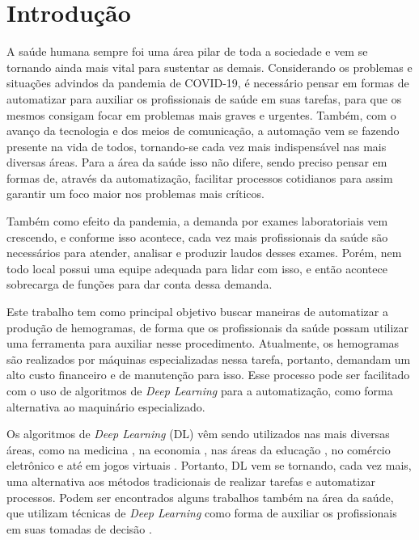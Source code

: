 \chapter{Introdução}
\label{chap:introducao}
A saúde humana sempre foi uma área pilar de toda a sociedade e vem se tornando ainda mais vital para sustentar as demais. Considerando os problemas e situações advindos da pandemia de COVID-19, é necessário pensar em formas de automatizar para auxiliar os profissionais de saúde em suas tarefas, para que os mesmos consigam focar em problemas mais graves e urgentes. Também, com o avanço da tecnologia e dos meios de comunicação, a automação vem se fazendo presente na vida de todos, tornando-se cada vez mais indispensável nas mais diversas áreas. Para a área da saúde isso não difere, sendo preciso pensar em formas de, através da automatização, facilitar processos cotidianos para assim garantir um foco maior nos problemas mais críticos.

Também como efeito da pandemia, a demanda por exames laboratoriais vem crescendo, e conforme isso acontece, cada vez mais profissionais da saúde são necessários para atender, analisar e produzir laudos desses exames. Porém, nem todo local possui uma equipe adequada para lidar com isso, e então acontece sobrecarga de funções para dar conta dessa demanda.

Este trabalho tem como principal objetivo buscar maneiras de automatizar a produção de hemogramas, de forma que os profissionais da saúde possam utilizar uma ferramenta para auxiliar nesse procedimento. Atualmente, os hemogramas são realizados por máquinas especializadas nessa tarefa, portanto, demandam um alto custo financeiro e de manutenção para isso. Esse processo pode ser facilitado com o uso de algoritmos de \emph{Deep Learning} para a automatização, como forma alternativa ao maquinário especializado.

Os algoritmos de \emph{Deep Learning} (DL) vêm sendo utilizados nas mais diversas áreas, como na medicina \cite{deepLearningMedicine}, na economia \cite{deepLearningEconomy}, nas áreas da educação \cite{deepLearningEducation}, no comércio eletrônico \cite{deepLearningEcommerce} e até em jogos virtuais \cite{deepLearningGaming}. Portanto, DL vem se tornando, cada vez mais, uma alternativa aos métodos tradicionais de realizar tarefas e automatizar processos. Podem ser encontrados alguns trabalhos também na área da saúde, que utilizam técnicas de \emph{Deep Learning} como forma de auxiliar os profissionais em suas tomadas de decisão \cite{deepLearningHealth1, deepLearningHealth2}.

